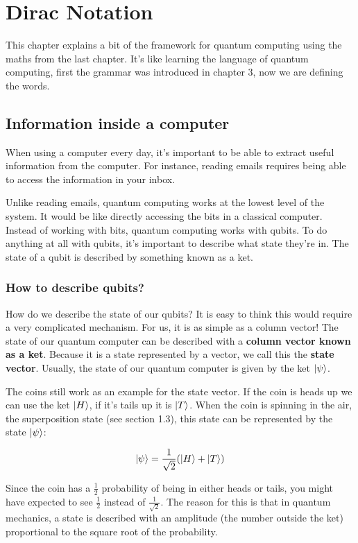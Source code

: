 \documentclass{book}
\begin{document}
\chapter{Dirac Notation}
This chapter explains a bit of the framework for quantum computing using the maths from the last chapter. It's like learning the language of quantum computing, first the grammar was introduced in chapter 3, now we are defining the words.  

\section{ Information inside a computer }

When using a computer every day, it's important to be able to extract useful information from the computer. For instance, reading emails requires being able to access the information in your inbox. 

Unlike reading emails, quantum computing works at the lowest level of the system. It would be like directly accessing the bits in a classical computer. Instead of working with bits, quantum computing works with qubits. To do anything at all with qubits, it's important to describe what state they're in. The state of a qubit is described by something known as a ket. 


\subsection{ How to describe qubits?}


How do we describe the state of our qubits? It is easy to think this would require a very complicated mechanism. For us, it is as simple as a column vector! The state of our quantum computer can be described with a \textbf{column vector known as a ket}. Because it is a state represented by a vector, we call this the \textbf{state vector}. Usually, the state of our quantum computer is given by the ket $\ket{\psi}$.

The coins still work as an example for the state vector. If the coin is heads up we can use the ket $\ket{H}$, if it's tails up it is $\ket{T}$. When the coin is spinning in the air, the superposition state (see section 1.3), this state can be represented by the state $\ket{\psi}$: 

$$
\ket{\psi} = \frac{1}{\sqrt{2}}(\ket{H} + \ket{T})
$$

Since the coin has a $\frac{1}{2}$ probability of being in either heads or tails, you might have expected to see $\frac{1}{2}$ instead of $\frac{1}{\sqrt{2}}$. The reason for this is that in quantum mechanics, a state is described with an amplitude (the number outside the ket) proportional to the square root of the probability. 
\end{document}

